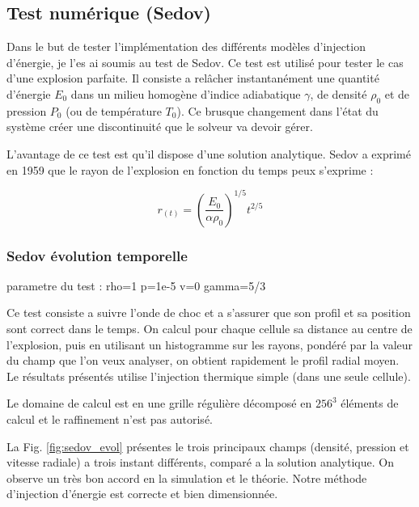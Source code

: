 \subsection{Test numérique (Sedov)}
\label{sec:sedov}


Dans le but de tester l'implémentation des différents modèles d'injection d'énergie, je l'es ai soumis au test de Sedov.
Ce test est utilisé pour tester le cas d'une explosion parfaite.
Il consiste a relâcher instantanément une quantité d'énergie $E_0$ dans un milieu homogène d'indice adiabatique $\gamma$, de densité $\rho_0$ et de pression $P_0$ (ou de température $T_0$).
Ce brusque changement dans l'état du système créer une discontinuité que le solveur va devoir gérer.

L'avantage de ce test est qu'il dispose d'une solution analytique.
Sedov a exprimé  en 1959 que le rayon de l'explosion en fonction du temps peux s'exprime : %

\begin{equation}
r_{(t)}=\left( \frac{E_0}{\alpha \rho_0 }\right)^{1/5} t^{2/5}
\end{equation}


\subsubsection{Sedov évolution temporelle }


parametre du test :
rho=1
p=1e-5
v=0
gamma=5/3


Ce test consiste a suivre l'onde de choc et a s'assurer que son profil et sa position sont correct dans le temps.
On calcul pour chaque cellule sa distance au centre de l'explosion, puis en utilisant un histogramme sur les rayons, pondéré par la valeur du champ que l'on veux analyser, on obtient rapidement le profil radial moyen.
Le résultats présentés utilise l'injection thermique simple (dans une seule cellule).

Le domaine de calcul est en une grille régulière décomposé en $256^3$ éléments  de calcul et le raffinement n'est pas autorisé.

La Fig. \ref{fig:sedov_evol} présentes le trois principaux champs (densité, pression et vitesse radiale) a trois instant différents, comparé a la solution analytique.
On observe un très bon accord en la simulation et le théorie.
Notre méthode d'injection d'énergie est correcte et bien dimensionnée.
%

